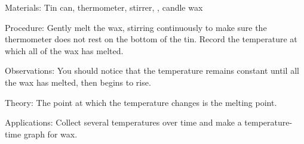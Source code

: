 \begin{multicols}{2}
\begin{description*}
\item[Materials:]{Tin can, thermometer, stirrer, , candle wax}
\item[Procedure:]{Gently melt the wax, stirring continuously to make sure the thermometer does not rest on the bottom of the tin. Record the temperature at which all of the wax has melted.}
\item[Observations:]{You should notice that the temperature remains constant until all the wax has melted, then begins to rise.}
\item[Theory:]{The point at which the temperature changes is the melting point.}
\item[Applications:]{Collect several temperatures over time and make a temperature-time graph for wax.}
\end{description*}

%
%


\end{multicols}
